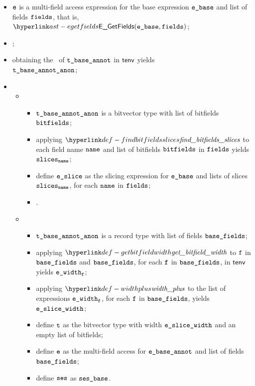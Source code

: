 \ProseParagraph
\AllApply
\begin{itemize}
  \item $\texttt{e}$ is a multi-field access expression for the base expression $\ebase$ and list of fields $\texttt{fields}$,
        that is, $\EGetFields(\ebase, \vfields)$;
  \item \Proseannotateexpr{$\tenv$}{$\ebase$}{\\ $(\tbaseannot, \vetwo, \vsesbase)$}\ProseOrTypeError;
  \item obtaining the \underlyingtype\ of $\texttt{t\_base\_annot}$ in $\tenv$ yields \\
        $\texttt{t\_base\_annot\_anon}$\ProseOrTypeError;
  \item \OneApplies
  \begin{itemize}
    \item {}
    \begin{itemize}
      \item $\texttt{t\_base\_annot\_anon}$ is a bitvector type with list of bitfields $\texttt{bitfields}$\ProseOrTypeError;
      \item applying $\findbitfieldsslices$ to each field name $\texttt{name}$ and list of bitfields $\texttt{bitfields}$ in $\texttt{fields}$ yields \\
            $\texttt{slices}_{\texttt{name}}$\ProseOrTypeError;
      \item define $\veslice$ as the slicing expression for $\ebase$ and lists of slices $\texttt{slices}_{\texttt{name}}$, for each $\texttt{name}$ in $\texttt{fields}$;
      \item \Proseannotateexpr{$\tenv$}{$\veslice$}{\\ $(\vt, \newe, \vses)$}\ProseOrTypeError.
    \end{itemize}

    \item {}
    \begin{itemize}
      \item $\texttt{t\_base\_annot\_anon}$ is a record type with list of fields $\texttt{base\_fields}$\ProseOrTypeError;
      \item applying $\getbitfieldwidth$ to $\texttt{f}$ in $\texttt{base\_fields}$ and $\texttt{base\_fields}$, for each $\texttt{f}$ in $\texttt{base\_fields}$, in $\tenv$ yields $\texttt{e\_width}_{\texttt{f}}$\ProseOrTypeError;
      \item applying $\widthplus$ to the list of expressions $\texttt{e\_width}_{\texttt{f}}$,
            for each $\texttt{f}$ in $\texttt{base\_fields}$, yields $\texttt{e\_slice\_width}$\ProseOrTypeError;
      \item define $\texttt{t}$ as the bitvector type with width $\texttt{e\_slice\_width}$ and an empty list of bitfields;
      \item define $\texttt{e}$ as the multi-field access for $\texttt{e\_base\_annot}$ and list of fields \\
            $\texttt{base\_fields}$;
      \item define $\texttt{ses}$ as $\texttt{ses\_base}$.
    \end{itemize}


\end{itemize}
\end{itemize}
